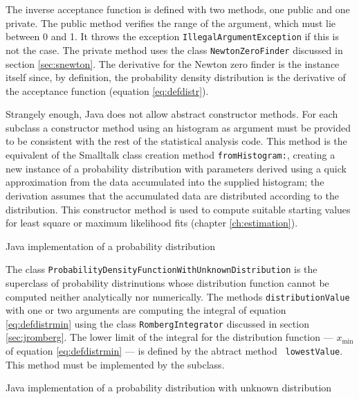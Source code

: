 \documentclass[twoside]{book}
\begin{document}
The inverse acceptance function is defined with two methods, one
public and one private. The public method verifies the range of
the argument, which must lie between 0 and 1. It throws the
exception {\tt IllegalArgumentException} if this is not the case.
The private method uses the class {\tt NewtonZeroFinder} discussed
in section \ref{sec:snewton}. The derivative for the Newton zero
finder is the instance itself since, by definition, the
probability density distribution is the derivative of the
acceptance function (\cf equation \ref{eq:defdistr}).

Strangely enough, Java does not allow abstract constructor
methods. For each subclass a constructor method using an histogram
as argument must be provided to be consistent with the rest of the
statistical analysis code. This method is the equivalent of the
Smalltalk class creation method {\tt fromHistogram:}, creating a
new instance of a probability distribution with parameters derived
using a quick approximation from the data accumulated into the
supplied histogram; the derivation assumes that the accumulated
data are distributed according to the distribution. This
constructor method is used to compute suitable starting values for
least square or maximum likelihood fits (\cf chapter
\ref{ch:estimation}).

\begin{listing} Java implementation of a probability distribution \label{lj:probdistr}

\end{listing}

The class {\tt ProbabilityDensityFunctionWithUnknownDistribution}
is the superclass of probability distrinutions whose distribution
function cannot be computed neither analytically nor numerically.
The methods {\tt distributionValue} with one or two arguments are
computing the integral of equation \ref{eq:defdistrmin} using the
class {\tt RombergIntegrator} discussed in section
\ref{sec:jromberg}. The lower limit of the integral for the
distribution function --- $x_{\min}$ of equation
\ref{eq:defdistrmin} --- is defined by the abtract method {\tt
lowestValue}. This method must be implemented by the subclass.

\begin{listing} Java implementation of a probability distribution with
unknown distribution \label{lj:probunkdistr}

\end{listing}
\end{document}
